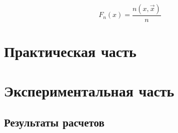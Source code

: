 \documentclass[12pt]{report}
\begin{document}
\begin{equation}
    F_n(x) = \frac{n(x, \vec x)}{n}
\end{equation}

\chapter{Практическая часть}

\begin{figure}[ht!]	
\end{figure}

\chapter{Экспериментальная часть}

\section{Результаты расчетов}

\begin{figure}[ht!]	
\end{figure}
\end{document}
